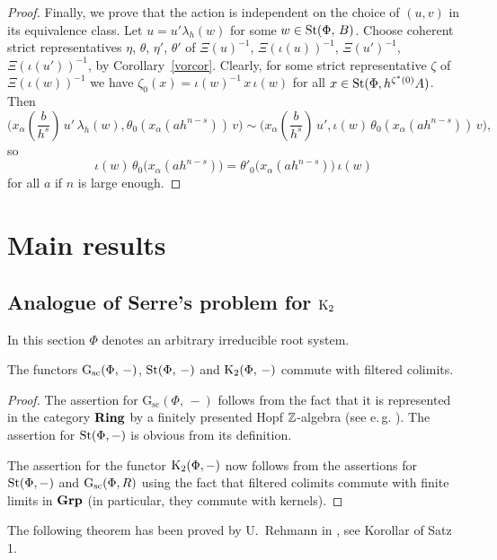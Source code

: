 \documentclass[oneside, 11pt]{amsart} \pdfoutput=1
\begin{document}
\begin{proof}
Finally, we prove that the action is independent on the choice of $(u, v)$ in its equivalence class. Let $u = u' \lambda_h(w)$ for some $w \in \mathop{\mathrm{St}}\nolimits(\Phi,\,B)$. Choose coherent strict representatives $\eta$, $\theta$, $\eta'$, $\theta'$ of $\Xi(u)^{-1}$, $\Xi(\iota(u))^{-1}$, $\Xi(u')^{-1}$, $\Xi(\iota(u'))^{-1}$, by Corollary~\ref{vorcor}. Clearly, for some strict representative $\zeta$ of $\Xi(\iota(w))^{-1}$ we have $\zeta_0(x) = \iota(w)^{-1}\, x\, \iota(w)$ for all $x \in \mathop{\mathrm{St}}\nolimits(\Phi, h^{\zeta^*(0)} A)$.
Then
$$\textstyle
\bigl(x_\alpha(\frac b {h^s})\, u'\, \lambda_h(w), \theta_0(x_\alpha(ah^{n - s}))\, v\bigr) \sim \bigl(x_\alpha(\frac b {h^s})\, u', \iota(w)\, \theta_0(x_\alpha(ah^{n - s}))\, v\bigr),
$$
so
$$
\iota(w)\, \theta_0\bigl(x_\alpha(ah^{n-s})\bigr) = \theta'_0\bigl(x_\alpha(ah^{n-s})\bigr)\, \iota(w)
$$
for all \(a\) if \(n\) is large enough.
\end{proof}

\section{Main results}\label{sec:main}
\subsection{Analogue of Serre's problem for \texorpdfstring{${\mathrm{K}}_2$}{K2}}

In this section $\Phi$ denotes an arbitrary irreducible root system.

\begin{lemma}
\label{k2cdc} 
The functors $\mathrm{G}_\mathrm{sc}(\Phi,\,-)$, $\mathop{\mathrm{St}}\nolimits(\Phi,\,-)$ and ${\mathrm{K}}_2(\Phi,\,-)$ commute with filtered colimits.
\end{lemma}
\begin{proof}
The assertion for $\mathrm G_{\mathrm{sc}}(\Phi,\,-)$ follows from the fact that it is represented in the category ${\normalfont\textbf{Ring}}$ by a finitely presented Hopf $\mathbb{Z}$-algebra (see e.\,g. \cite[Lemma~10.127.3]{stacks-project}). The assertion for $\mathop{\mathrm{St}}\nolimits(\Phi, -)$ is obvious from its definition. 

The assertion for the functor ${\mathrm{K}}_2(\Phi, -)$ now follows from the assertions for $\mathop{\mathrm{St}}\nolimits(\Phi, -)$ and $\mathrm{G}_\mathrm{sc}(\Phi, R)$ using the fact that filtered colimits commute with finite limits in ${\normalfont\textbf{Grp}}$ (in particular, they commute with kernels).
\end{proof}

The following theorem has been proved by U.~Rehmann in \cite{Re75}, see Korollar of Satz 1.
\end{document}
